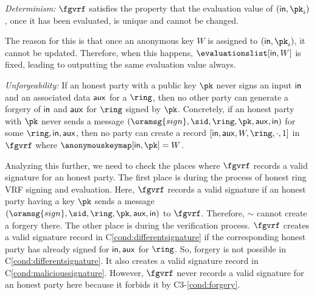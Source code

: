 	
	
	
\smallskip
	\noindent \textit{Determinism:} $ \fgvrf $  satisfies the property that the evaluation value  of $ (\msg, \pk_i) $, once it has been evaluated, is unique and  cannot be changed. 
	
	The reason for this is that once an anonymous key $ W $ is assigned to $ (\msg, \pk_i) $, it cannot be updated. Therefore, when this happens, $ \evaluationslist[\msg, W] $ is fixed, leading to outputting the same evaluation value always.
	
\smallskip
	\noindent \textit{Unforgeability:}  If an honest party with a public key $ \pk $ never signs an input $ \mathsf{in} $  and an associated data $ \mathsf{aux} $ for a $ \ring $, then no other party can generate a  forgery of $ \mathsf{in} $ and $ \mathsf{aux} $ for $ \ring $ signed by $ \pk $. Concretely, if an honest party with $ \pk $ never sends a message $(\oramsg{sign}, \sid, \ring, \pk,\aux, \msg)$ for some $ \ring, \msg, \aux $, then  no party can create a record $ [\msg, \aux,W,\ring, \cdot , 1] $ in $ \fgvrf $  where $ \anonymouskeymap[\msg,\pk] = W $.
	
	Analyzing this further, we need to check the places where $ \fgvrf $ records a valid signature for an honest party. The first place is during the process of honest ring VRF signing and evaluation. Here, $ \fgvrf $ records a valid signature if an honest party having a key $ \pk $ sends a message $ (\oramsg{sign}, \sid,\ring,\pk,\aux,\msg) $ to $ \fgvrf $. Therefore, 	$ \sim $ cannot create a forgery there.
	The other place is during the verification process. $ \fgvrf $ creates a valid signature record in C\ref{cond:differentsignature} if the corresponding honest party has already signed for $ \mathsf{in}, \mathsf{aux} $ for $ \ring $. So, forgery is not possible  in C\ref{cond:differentsignature}. It also creates a valid signature record in C\ref{cond:malicioussignature}. However, $ \fgvrf $ never records a valid signature  for an honest party here because it forbids it by C3-\ref{cond:forgery}.
	

